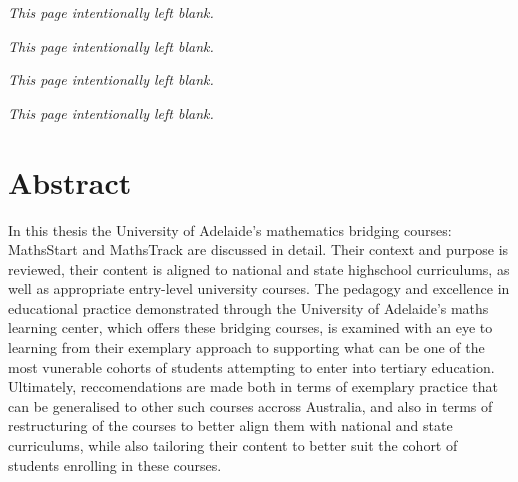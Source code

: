 \documentclass[twoside,12pt,a4paper]{report}
\makeatletter
\newcommand*{\intentionallyblankpage}{
  \vspace*{\fill}
  {\centering \textit{This page intentionally left blank.} \par}
  \vspace{\fill}}
\renewcommand*{\cleardoublepage}{\clearpage\if@twoside \ifodd\c@page\else
  \intentionallyblankpage
  \newpage
  \if@twocolumn\hbox{}\newpage\fi\fi\fi}
\makeatother
\begin{document}



\setcounter{page}{2}
\intentionallyblankpage
\newpage
\intentionallyblankpage
\tableofcontents



\glsaddall
\newpage
\intentionallyblankpage
\printglossaries
{}



\glsresetall
\cleardoublepage
\chapter*{Abstract}

In this thesis the University of Adelaide's mathematics bridging courses: MathsStart and MathsTrack are discussed in detail. Their context and purpose is reviewed, their content is aligned to national and state highschool curriculums, as well as appropriate entry-level university courses. The pedagogy and excellence in educational practice demonstrated through the University of Adelaide's maths learning center, which offers these bridging courses, is examined with an eye to learning from their exemplary approach to supporting what can be one of the most vunerable cohorts of students attempting to enter into tertiary education. Ultimately, reccomendations are made both in terms of exemplary practice that can be generalised to other such courses accross Australia, and also in terms of restructuring of the courses to better align them with national and state curriculums, while also tailoring their content to better suit the cohort of students enrolling in these courses.




% 
\end{document}
